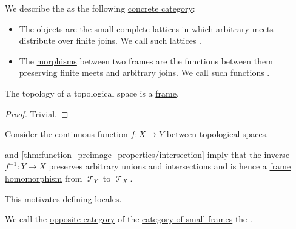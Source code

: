 \begin{definition}\label{def:category_of_small_frames}
  We describe the  as the following \hyperref[def:concrete_category]{concrete category}:

  \begin{itemize}
    \item The \hyperref[def:category/objects]{objects} are the \hyperref[def:small_set]{small} \hyperref[def:complete_lattice]{complete lattices} in which arbitrary meets distribute over finite joins. We call such lattices .

    \item The \hyperref[def:category/morphisms]{morphisms} between two frames are the functions between them preserving finite meets and arbitrary joins. We call such functions .
  \end{itemize}
\end{definition}

\begin{proposition}\label{thm:topological_spaces_are_frames}
  The topology of a topological space is a \hyperref[def:category_of_small_frames]{frame}.
\end{proposition}
\begin{proof}
  Trivial.
\end{proof}

\begin{remark}\label{rem:topology_frame_homomorphism}
  Consider the continuous function \( f: X \to Y \) between topological spaces.

   and \cref{thm:function_preimage_properties/intersection} imply that the inverse \( f^{-1}: Y \to X \) preserves arbitrary unions and intersections and is hence a \hyperref[def:category_of_small_frames]{frame homomorphism} from \( \mscrT_Y \) to \( \mscrT_X \).

  This motivates defining \hyperref[def:category_of_small_locales]{locales}.
\end{remark}

\begin{definition}\label{def:category_of_small_locales}
  We call the \hyperref[def:opposite_category]{opposite category} of the \hyperref[def:category_of_small_frames]{category of small frames} the .
\end{definition}


